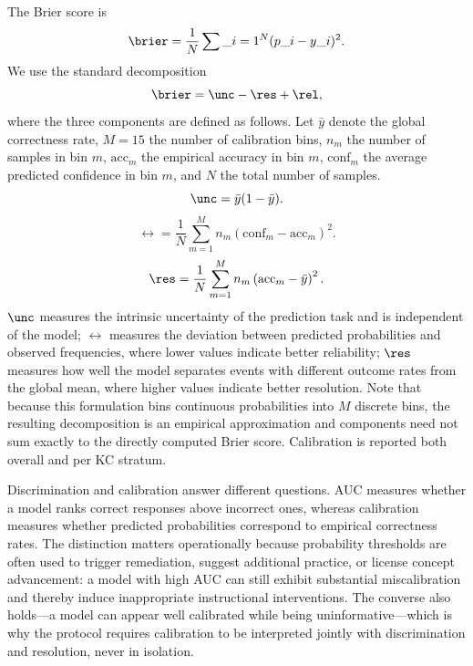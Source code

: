 The Brier score is
\begin{equation}
\brier = \frac{1}{N}\sum\_{i=1}^{N}(p\_i-y\_i)^2.
\end{equation}
We use the standard decomposition
\begin{equation}
\brier = \unc - \res + \rel,
\end{equation}
where the three components are defined as follows. Let $\bar{y}$ denote the global correctness rate, $M=15$ the number of calibration bins, $n_m$ the number of samples in bin $m$, $\mathrm{acc}_m$ the empirical accuracy in bin $m$, $\mathrm{conf}_m$ the average predicted confidence in bin $m$, and $N$ the total number of samples.
\begin{equation}
\unc = \bar{y}(1-\bar{y}).
\end{equation}
\begin{equation}
\rel = \frac{1}{N}\sum_{m=1}^{M} n_m
\left(\mathrm{conf}_m - \mathrm{acc}_m\right)^2.
\end{equation}
\begin{equation}
\res = \frac{1}{N}\sum_{m=1}^{M} n_m
\left(\mathrm{acc}_m - \bar{y}\right)^2.
\end{equation}
$\unc$ measures the intrinsic uncertainty of the prediction task and is independent of the model; $\rel$ measures the deviation between predicted probabilities and observed frequencies, where lower values indicate better reliability; $\res$ measures how well the model separates events with different outcome rates from the global mean, where higher values indicate better resolution. Note that because this formulation bins continuous probabilities into $M$ discrete bins, the resulting decomposition is an empirical approximation and components need not sum exactly to the directly computed Brier score.
Calibration is reported both overall and per KC stratum.

Discrimination and calibration answer different questions. AUC measures whether a model ranks correct responses above incorrect ones, whereas calibration measures whether predicted probabilities correspond to empirical correctness rates. The distinction matters operationally because probability thresholds are often used to trigger remediation, suggest additional practice, or license concept advancement: a model with high AUC can still exhibit substantial miscalibration and thereby induce inappropriate instructional interventions. The converse also holds---a model can appear well calibrated while being uninformative---which is why the protocol requires calibration to be interpreted jointly with discrimination and resolution, never in isolation.

